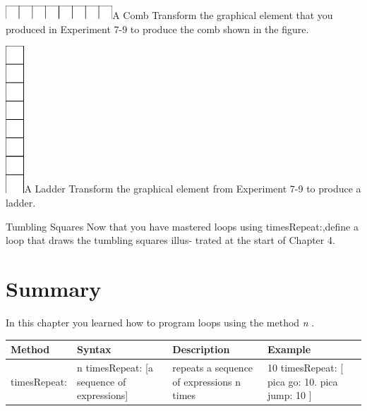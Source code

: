 \documentclass[a4paper,10pt,twoside]{book}
\begin{document}
\begin{exofigwithsizeandtitle}[0.55]{\includegraphics[width=4cm]{loopComb}}{A Comb} 
Transform the graphical element that you produced in Experiment 7-9 to produce the comb shown in the figure.
\end{exofigwithsizeandtitle}

\begin{exofigwithsizeandtitle}[0.65]{\includegraphics[width=0.7cm]{loopLadder}}{A Ladder}
Transform the graphical element from Experiment 7-9 to produce a ladder. 
\end{exofigwithsizeandtitle}

\begin{exonofigtitle}{Tumbling Squares} 
Now that you have mastered loops using timesRepeat:,define a loop that draws the tumbling squares illus- 
trated at the start of Chapter 4. 
\end{exonofigtitle}


\section{Summary} 

In this chapter you learned how to program loops using the method \emph{n} . 

\vspace*{5mm}
\noindent
\setlength{\extrarowheight}{1mm}
{\small \begin{tabular}{p{14mm}p{23mm}p{45mm}p{22mm}}
\hline
\textbf{Method} & \textbf{Syntax} & \textbf{Description} & \textbf{Example}\\
\hline
\textsf{timesRepeat:} & \textsf{n timesRepeat: [a sequence of expressions]} & repeats a sequence of expressions n times & 
\textsf{10 timesRepeat: [ pica go: 10. 
pica jump: 10 ]}\\
\hline
\end{tabular}}









\ifx\wholebook\relax\else
\end{document}
